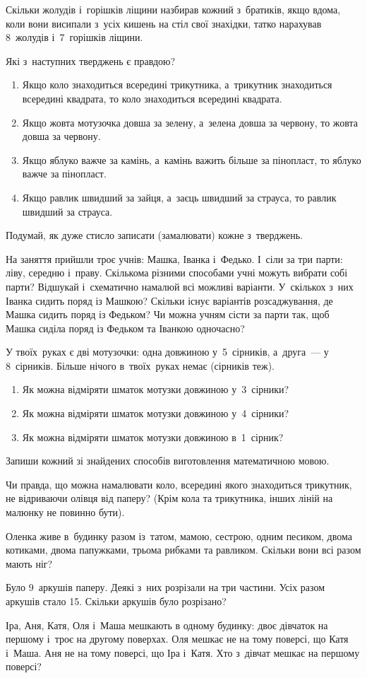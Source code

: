 Скільки жолудів і~горішків ліщини назбирав кожний з~братиків,
якщо вдома, коли вони висипали з~усіх кишень на стіл свої знахідки,
татко нарахував 8~жолудів і~7~горішків ліщини.


\problem
Які з~наступних тверджень є правдою?
\begin{enumerate}
  \item Якщо коло знаходиться всередині трикутника,
  а~трикутник знаходиться всередині квадрата,
  то коло знаходиться всередині квадрата.
  \item Якщо жовта мотузочка довша за зелену,
  а~зелена довша за червону, то жовта довша за червону.
  \item Якщо яблуко важче за камінь, а~камінь важить більше за пінопласт,
  то яблуко важче за пінопласт.
  \item Якщо равлик швидший за зайця, а~заєць швидший за страуса,
  то равлик швидший за страуса.
\end{enumerate}
Подумай, як дуже стисло записати (замалювати) кожне з~тверджень.


\problem
На заняття прийшли троє учнів: Машка, Іванка і~Федько.
І~сіли за три парти: ліву, середню і~праву.
Скількома різними способами учні можуть вибрати собі парти?
Відшукай і~схематично намалюй всі можливі варіанти.
У~скількох з~них Іванка сидить поряд із Машкою?
Скільки існує варіантів розсаджування, де Машка сидить поряд із Федьком?
Чи можна учням сісти за парти так,
щоб Машка сиділа поряд із Федьком та Іванкою одночасно?



\problem
У твоїх~руках є дві мотузочки:
одна довжиною у~5~сірників, а~друга~--- у 8~сірників.
Більше нічого в~твоїх~руках немає (сірників теж).
\begin{enumerate}
  \item Як можна відміряти шматок мотузки довжиною у~3~сірники?
  \item Як можна відміряти шматок мотузки довжиною у~4~сірники?
  \item Як можна відміряти шматок мотузки довжиною в~1~сірник?
\end{enumerate}
Запиши кожний зі знайдених способів виготовлення математичною мовою.


\problem
Чи правда, що можна намалювати коло, всередині якого знаходиться
трикутник, не відриваючи олівця від паперу?
(Крім кола та трикутника, інших ліній на малюнку не повинно бути).


\problem
Оленка живе в~будинку разом із~татом, мамою, сестрою, одним песиком,
двома котиками, двома папужками, трьома рибками та равликом.
Скільки вони всі разом мають ніг?


\problem
Було 9~аркушів паперу. Деякі з~них розрізали на три частини.
Усіх разом аркушів стало 15.
Скільки аркушів було розрізано?


\problem
Іра, Аня, Катя, Оля і~Маша мешкають в одному будинку:
двоє дівчаток на першому і~троє на другому поверхах.
Оля мешкає не на тому поверсі, що Катя і~Маша.
Аня не на тому поверсі, що Іра і~Катя.
Хто з~дівчат мешкає на першому поверсі?
